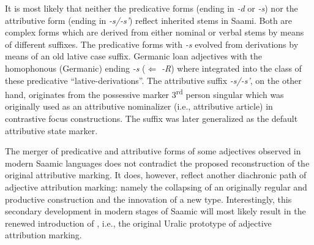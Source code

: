 {
It is most likely that neither the predicative forms (ending in \textit{-d} or \textit{-s}) nor the attributive form (ending in \textit{-s/-s'}) reflect inherited stems in Saami. Both are complex forms which are derived from either nominal or verbal stems by means of different suffixes. The predicative forms with \textit{-s} evolved from derivations by means of an old lative case suffix. Germanic loan adjectives with the homophonous (Germanic) ending \textit{-s} ($\Leftarrow$  \textit{-R}) where integrated into the class of these predicative “lative-derivations”. The attributive suffix \textit{-s/-s'}, on the other hand, originates from the possessive marker 3\textsuperscript{rd} person singular which was originally used as an attributive nominalizer (i.e., attributive article) in contrastive focus constructions. The suffix was later generalized as the default attributive state marker.

The merger of predicative and attributive forms of some adjectives observed in modern Saamic languages does not contradict the proposed reconstruction of the original attributive marking. It does, however, reflect another diachronic path of adjective attribution marking: namely the collapsing of an originally regular and productive construction and the innovation of a new type. Interestingly, this secondary development in modern stages of Saamic will most likely result in the renewed introduction of , i.e., the original Uralic prototype of adjective attribution marking.

}
